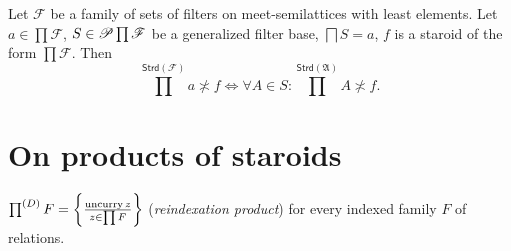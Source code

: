 \begin{conjecture}
Let $\mathscr{F}$ be a family of sets of filters on meet-semilattices
with least elements. Let $a\in\prod\mathscr{F}$, $S\in\mathscr{P}\prod\mathscr{F}$
be a generalized filter base, $\bigsqcap S=a$, $f$ is a staroid
of the form $\prod\mathscr{F}$. Then 
\[
\prod^{\mathsf{Strd}(\mathscr{F})}a\nasymp f\Leftrightarrow\forall A\in S:\prod^{\mathsf{Strd}(\mathfrak{A})}A\nasymp f.
\]

\end{conjecture}

\section{On products of staroids}
\begin{defn}
$\prod^{(D)}F=\left\{ \frac{\operatorname{uncurry} z}{z\in\prod F}\right\}$
(\emph{reindexation product}) for every indexed family $F$ of relations.
\end{defn}

